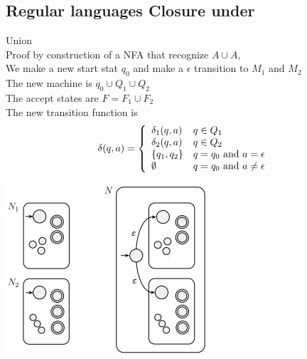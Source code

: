 \documentclass[a4paper,10pt,titlepage]{report}
\begin{document}
\subsection{Regular languages Closure under}
\begin{multicols}{2}


Union\\
Proof by construction of a NFA that recognize $A \cup A$,\\ 
We make a new start stat $q_0$ and make a $\epsilon$ transition to $M_1$ and $M_2$\\
The new machine is $q_0 \cup Q_1 \cup Q_2$ \\
The accept states are $F = F_1 \cup F_2$\\
The new transition function is\\

\[
\delta(q,a) = \left\{
                \begin{array}{ll}
                \delta_1(q,a) & q \in Q_1  \\
\delta_2(q,a) & q \in Q_2 \\
\{q_1,q_2\} & q = q_0$ and $a = \epsilon \\
\emptyset & q = q_0$ and $a \neq \epsilon 
\end{array}
\right.
  \]
\includegraphics[scale=0.4,right]{Regular_Union.png}
\end{multicols}
\newpage
\end{document}
